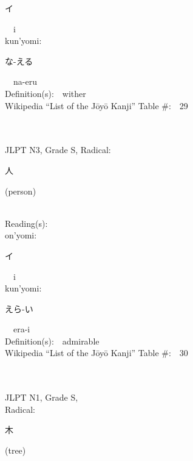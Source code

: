 \begin{multicols}{2}
{\hspace*{2em}}{\begin{CJK}{UTF8}{min} イ \end{CJK}}\ \ i\ \ \\
{\hspace*{1em}}kun'yomi:\ \ \\
{\hspace*{2em}}{\begin{CJK}{UTF8}{min} な-える \end{CJK}}\ \ na-eru\ \ \\
Definition(s):\ \ wither \\
Wikipedia ``List of the J\=oy\=o Kanji'' Table \#:\ \ 29 \\
\ \ \\
{\fontsize{34pt}{40pt}  }\ \ \\  %
{JLPT N3, Grade S, Radical:\ \ {\begin{CJK}{UTF8}{min} 人 \end{CJK}} (person) } \\
Reading(s):\ \ \\
{\hspace*{1em}}on'yomi:\ \ \\
{\hspace*{2em}}{\begin{CJK}{UTF8}{min} イ \end{CJK}}\ \ i\ \ \\
{\hspace*{1em}}kun'yomi:\ \ \\
{\hspace*{2em}}{\begin{CJK}{UTF8}{min} えら-い \end{CJK}}\ \ era-i\ \ \\
Definition(s):\ \ admirable \\
Wikipedia ``List of the J\=oy\=o Kanji'' Table \#:\ \ 30 \\
\ \ \\
{\fontsize{34pt}{40pt}  }\ \ \\
{JLPT N1, Grade S, \\Radical:\ \ {\begin{CJK}{UTF8}{min} 木 \end{CJK}} (tree) } \\

\end{multicols}
